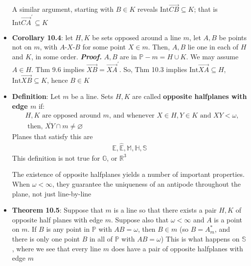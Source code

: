 \documentclass{report}
\begin{document}
\begin{itemize}
            \bigbreak \noindent 
            A similar argument, starting with $B \in K$ reveals $\text{Int}\overrightarrow{CB}\subseteq K$; that is $\text{Int}\overrightarrow{CA}^{\prime} \subseteq K$
        \item \textbf{Corollary 10.4}: let $H,K$ be sets opposed around a line $m$, let $A,B$ be points not on $m$, with $ A\text{-}X\text{-}B$ for some point $X \in m$. Then, $A,B$ lie one in each of $H$ and $K$, in some order.
            \bigbreak \noindent 
            \textbf{\textit{Proof.}} $A,B$ are in $\mathbb{P} - m = H \cup K$. We may assume $A \in H$. Thm 9.6 implies $ \overrightarrow{XB} = \overrightarrow{XA}^{\prime}$. So, Thm 10.3 implies $\text{Int}\overrightarrow{XA} \subseteq H$, $\text{Int}\overrightarrow{XB} \subseteq K$, hence $B \in K$
        \item \textbf{Definition}: Let $m$ be a line. Sets $H,K$ are called \textbf{opposite halfplanes with edge $m$} if:
            \bigbreak \noindent 
            \begin{align*}
                &H,K \text{ are opposed around $m$, and whenever } X \in H, Y \in K \text{ and } XY < \omega, \\ &\text{ then, } \overline{XY} \cap m \ne \varnothing
            \end{align*}
            Planes that satisfy this are
            \begin{align*}
                \mathbb{E}, \hat{\mathbb{E}}, \mathbb{M}, \mathbb{H}, \mathbb{S}
            \end{align*}
            This definition is not true for $\mathbb{G}$, or $\mathbb{R}^{3} $
            \bigbreak \noindent 
\begin{figure}[ht]
    \centering
    \label{fig:somefig2}
\end{figure}
            \bigbreak \noindent 
            The existence of opposite halfplanes yields a number of important properties. When $\omega < \infty$, they guarantee the uniqueness of an antipode throughout the plane, not just line-by-line
        \item \textbf{Theorem 10.5}: Suppose that $m$ is a line  so that there exists a pair $H,K$ of opposite half planes with edge $m$. Suppose also that $\omega < \infty$ and $A$ is a point on $m$. If $B$ is any point in $\mathbb{P}$ with $AB = \omega$, then $B \in m$ (so $B = A_{m}^{*}$, and there is only one point $B$ in all of $\mathbb{P}$ with $AB = \omega$)
            \bigbreak \noindent 
            This is what happens on $\mathbb{S}$, where we see that every line $m$ does have a pair of opposite halfplanes with edge $m$

\end{itemize}
\end{document}
